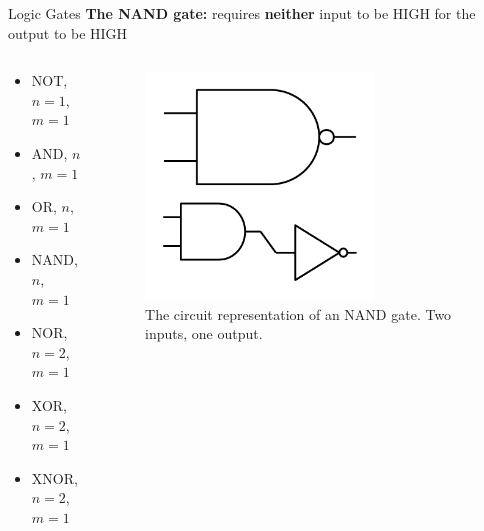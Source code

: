 \documentclass{beamer}
\begin{document}
\begin{frame}{Logic Gates}
\textbf{The NAND gate:} requires \textbf{neither} input to be HIGH for the output to be HIGH \\ \vspace{0.5cm}
\begin{columns}[T]
\begin{column}{0.5\textwidth}
\begin{itemize}
\item \alert{NOT, $n=1$, $m=1$}
\item \alert{AND, $n$, $m=1$}
\item \alert{OR, $n$, $m=1$}
\item \alert{NAND, $n$, $m=1$}
\item NOR, $n=2$, $m=1$
\item XOR, $n=2$, $m=1$
\item XNOR, $n=2$, $m=1$
\end{itemize}
\end{column}
\begin{column}{0.5\textwidth}
\begin{figure}
\centering
\includegraphics[width=0.7\textwidth]{figures/BasicNAND.pdf}
\caption{\label{fig:nand} The circuit representation of an NAND gate.  Two inputs, one output.}
\end{figure}
\end{column}
\end{columns}
\end{frame}
\end{document}
